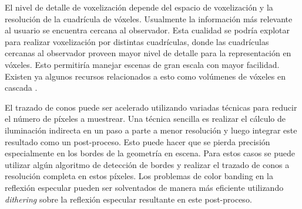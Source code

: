El nivel de detalle de voxelización depende del espacio de voxelización y la resolución de la cuadrícula de vóxeles. Usualmente la información más relevante al usuario se encuentra cercana al observador. Esta cualidad se podría explotar para realizar voxelización por distintas cuadrículas, donde las cuadrículas cercanas al observador proveen mayor nivel de detalle para la representación en vóxeles. Esto permitiría manejar escenas de gran escala con mayor facilidad. Existen ya algunos recursos relacionados a esto como volúmenes de vóxeles en cascada \cite{McLaren:2015:TCL:2775280.2792546}.

El trazado de conos puede ser acelerado utilizando variadas técnicas para reducir el número de píxeles a muestrear. Una técnica sencilla es realizar el cálculo de iluminación indirecta en un paso a parte a menor resolución y luego integrar este resultado como un post-proceso. Esto puede hacer que se pierda precisión especialmente en los bordes de la geometría en escena. Para estos casos se puede utilizar algún algoritmo de detección de bordes y realizar el trazado de conos a resolución completa en estos píxeles. Los problemas de color banding en la reflexión especular pueden ser solventados de manera más eficiente utilizando \emph{dithering} sobre la reflexión especular resultante en este post-proceso.
